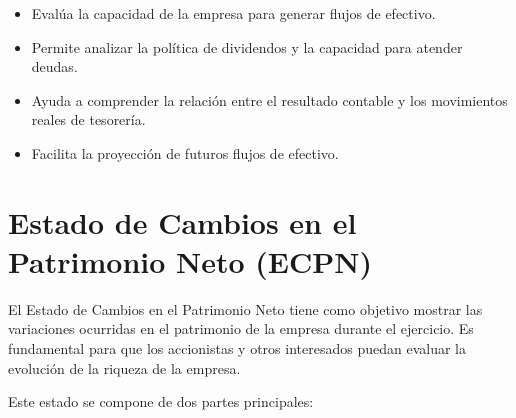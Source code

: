 \documentclass[
  paper=a4,
  ,captions=tableheading
]{scrbook}
\providecommand{\tightlist}{%
  \setlength{\itemsep}{0pt}\setlength{\parskip}{0pt}}
\begin{document}
\begin{itemize}
  \begin{itemize}
  \tightlist
  \item
    Evalúa la capacidad de la empresa para generar flujos de efectivo.
  \item
    Permite analizar la política de dividendos y la capacidad para
    atender deudas.
  \item
    Ayuda a comprender la relación entre el resultado contable y los
    movimientos reales de tesorería.
  \item
    Facilita la proyección de futuros flujos de efectivo.
  \end{itemize}
\end{itemize}

\hypertarget{estado-de-cambios-en-el-patrimonio-neto-ecpn}{%
\section{Estado de Cambios en el Patrimonio Neto
(ECPN)}\label{estado-de-cambios-en-el-patrimonio-neto-ecpn}}

El Estado de Cambios en el Patrimonio Neto tiene como objetivo mostrar
las variaciones ocurridas en el patrimonio de la empresa durante el
ejercicio. Es fundamental para que los accionistas y otros interesados
puedan evaluar la evolución de la riqueza de la empresa.

Este estado se compone de dos partes principales:
\end{document}
